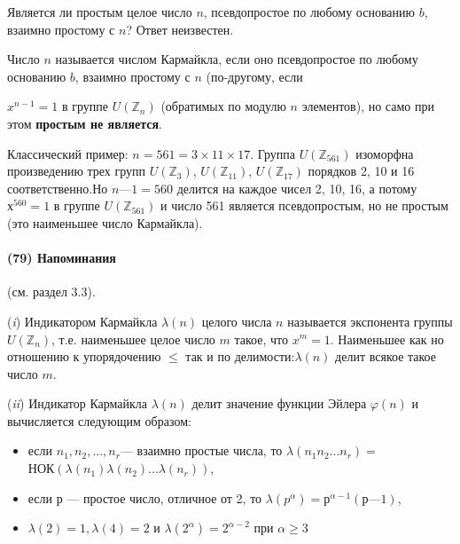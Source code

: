   	\noindent
  	
	Является ли простым целое число $n$, псевдопростое по любому основанию $b$, взаимно простому с $n$? Ответ неизвестен.

  	

  	
	\begin{determ}
  	
	\noindent
  	

  	
	Число $n$ называется числом Кармайкла, если оно псевдопростое
	по любому основанию $b$, взаимно простому с $n$ (по-другому, если
  	

  	
	\pagebreak
  	
  	 \noindent
  	 $x^{n-1} = 1$ в группе $U(\mathbb Z_n)$ (обратимых по модулю $n$ элементов), но само при этом {\bf простым не является}. 
  	\end{determ}
  	Классический пример: $n = 561 = 3 \times 11 \times 17$. Группа $U(\mathbb Z_{561})$ изоморфна произведению трех групп $U(\mathbb Z_3)$, $U(\mathbb Z_{11})$, $U(\mathbb Z_{17})$ порядков 2, 10	и 16 соответственно.Но $n — 1 = 560$ делится на каждое чисел 2, 10, 16, а потому $х^{560} = 1$ в группе $U(\mathbb Z_{561})$ и число 561 является псевдопростым,	но не простым (это наименьшее число Кармайкла).

  	
  	\paragraph{(79) Напоминания} (см. раздел 3.3).
  	\noindent
  	
  	({\it i}) Индикатором Кармайкла $\lambda(n)$ целого числа $n$ называется экспонента группы $U(\mathbb Z_{n})$, т.е. наименьшее целое число $m$ такое, что $x^m = 1$.	Наименьшее как но отношению к упорядочению $\leqslant$ так и по делимости:$\lambda(n)$ делит всякое такое число $m$.
  	
  	({\it ii}) Индикатор Кармайкла $\lambda(n)$ делит значение функции Эйлера 	$\varphi(n)$ и вычисляется следующим образом:
  	\begin{itemize}
  		\item если $n_1,n_2,...,n_r$— взаимно простые числа, то $\lambda(n_1n_2...n_r)=$ \\ НОК$(\lambda(n_1)\lambda(n_2)...\lambda(n_r))$,
  		\item если $р$ — простое число, отличное от 2, то $\lambda(p^{\alpha}) = р^{\alpha-1}(р — 1)$,
  		\item $\lambda(2)=1,\lambda(4)=2$ и $\lambda(2^{\alpha})=2^{\alpha-2}$ при $\alpha \geqslant 3$
  	\end{itemize}
  
